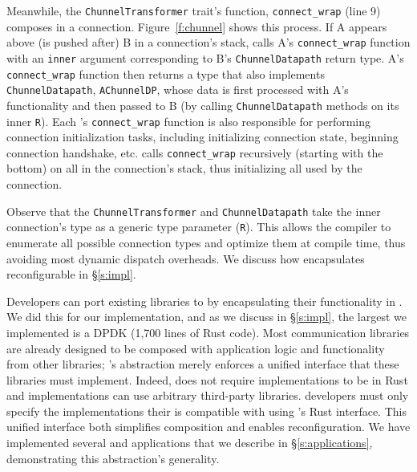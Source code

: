 Meanwhile, the \texttt{ChunnelTransformer} trait's function, \texttt{connect\_wrap} (line 9) composes \tunnels in a connection. Figure~\ref{f:chunnel} shows this process. 
If \tunnel A appears above (\ie is pushed after) \tunnel B in a connection's stack, \name calls \tunnel A's \texttt{connect\_wrap} function with an \texttt{inner} argument corresponding to \tunnel B's \texttt{ChunnelDatapath} return type. 
\tunnel A's \texttt{connect\_wrap} function then returns a type that also implements \texttt{ChunnelDatapath}, \texttt{AChunnelDP}, whose data is first processed with \tunnel A's functionality and then passed to \tunnel B (by calling \texttt{ChunnelDatapath} methods on its inner \texttt{R}). 
Each \tunnel's \texttt{connect\_wrap} function is also responsible for performing connection initialization tasks, including initializing connection state, beginning connection handshake, etc. \name calls \texttt{connect\_wrap} recursively (starting with the bottom) on all \tunnels in the connection's stack, thus initializing all \tunnels used by the connection.

Observe that the \texttt{ChunnelTransformer} and \texttt{ChunnelDatapath} take the inner connection's type as a generic type parameter (\texttt{R}).
This allows the compiler to enumerate all possible connection types and optimize them at compile time, thus avoiding most dynamic dispatch overheads. %
We discuss how \name encapsulates reconfigurable \tunnels in \S\ref{s:impl}.

Developers can port existing libraries to \name by encapsulating their functionality in \tunnels.
We did this for our implementation, and as we discuss in \S\ref{s:impl}, the largest \tunnel we implemented is a DPDK \tunnel (1,700 lines of Rust code).
Most communication libraries are already designed to be composed with application logic and functionality from other libraries; \name's \tunnel abstraction merely enforces a unified interface that these libraries must implement. 
Indeed, \name does not require \tunnel implementations to be in Rust and implementations can use arbitrary third-party libraries. \tunnel developers must only specify the implementations their \tunnel is compatible with using \name's Rust interface.
This unified interface both simplifies composition and enables reconfiguration.
We have implemented several \tunnels and \name applications that we describe in \S\ref{s:applications}, demonstrating this abstraction's generality.

